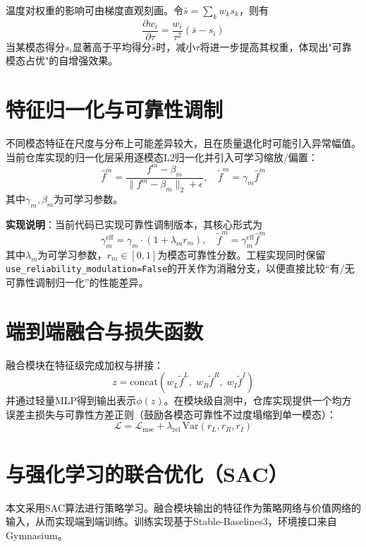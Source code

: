 温度对权重的影响可由梯度直观刻画。令$\bar{s}=\sum_k w_k s_k$，则有
\begin{equation}
    \frac{\partial w_i}{\partial \tau}=\frac{w_i}{\tau^2}(\bar{s}-s_i)
\end{equation}
当某模态得分$s_i$显著高于平均得分$\bar{s}$时，减小$\tau$将进一步提高其权重，体现出"可靠模态占优"的自增强效果。

\section{特征归一化与可靠性调制}
不同模态特征在尺度与分布上可能差异较大，且在质量退化时可能引入异常幅值。当前仓库实现的归一化层采用逐模态L2归一化并引入可学习缩放/偏置：
\begin{equation}
    \hat{f}^m = \frac{f^m-\beta_m}{\lVert f^m-\beta_m\rVert_2+\epsilon},\quad \tilde{f}^m=\gamma_m\hat{f}^m
\end{equation}
其中$\gamma_m,\beta_m$为可学习参数。

\textbf{实现说明}：当前代码已实现可靠性调制版本，其核心形式为
\begin{equation}
    \gamma_m^{\text{eff}}=\gamma_m\cdot(1+\lambda_m r_m),\quad \tilde{f}^m=\gamma_m^{\text{eff}}\hat{f}^m
\end{equation}
其中$\lambda_m$为可学习参数，$r_m\in[0,1]$为模态可靠性分数。工程实现同时保留\texttt{use\_reliability\_modulation=False}的开关作为消融分支，以便直接比较“有/无可靠性调制归一化”的性能差异。

\section{端到端融合与损失函数}
融合模块在特征级完成加权与拼接：
\begin{equation}
    z = \mathrm{concat}(w_L\tilde{f}^L,\;w_R\tilde{f}^R,\;w_I\tilde{f}^I)
\end{equation}
并通过轻量MLP得到输出表示$\phi(z)$。在模块级自测中，仓库实现提供一个均方误差主损失与可靠性方差正则（鼓励各模态可靠性不过度塌缩到单一模态）：
\begin{equation}
    \mathcal{L} = \mathcal{L}_{\text{mse}} + \lambda_{\text{rel}}\,\mathrm{Var}(r_L,r_R,r_I)
\end{equation}

\section{与强化学习的联合优化（SAC）}
本文采用SAC算法\cite{haarnoja2018sac}进行策略学习。融合模块输出的特征作为策略网络与价值网络的输入，从而实现端到端训练。训练实现基于Stable-Baselines3\cite{raffin2021sb3}，环境接口来自Gymnasium\cite{gymnasium2023}。

